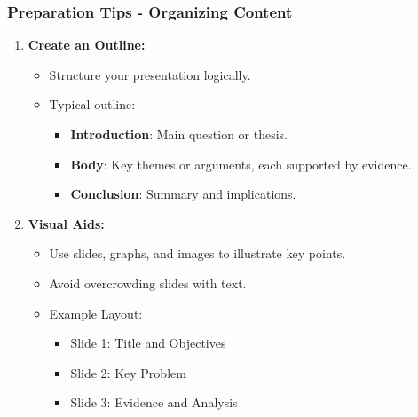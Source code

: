\documentclass[aspectratio=169]{beamer}
\begin{document}
\begin{frame}[fragile]
    \frametitle{Preparation Tips - Organizing Content}
    \begin{enumerate}
        \item \textbf{Create an Outline:}
            \begin{itemize}
                \item Structure your presentation logically.
                \item Typical outline:
                \begin{itemize}
                    \item \textbf{Introduction}: Main question or thesis.
                    \item \textbf{Body}: Key themes or arguments, each supported by evidence.
                    \item \textbf{Conclusion}: Summary and implications.
                \end{itemize}
            \end{itemize}

        \item \textbf{Visual Aids:}
            \begin{itemize}
                \item Use slides, graphs, and images to illustrate key points.
                \item Avoid overcrowding slides with text.
                \item Example Layout:
                \begin{itemize}
                    \item Slide 1: Title and Objectives
                    \item Slide 2: Key Problem
                    \item Slide 3: Evidence and Analysis
                \end{itemize}
            \end{itemize}
    \end{enumerate}
\end{frame}
\end{document}
